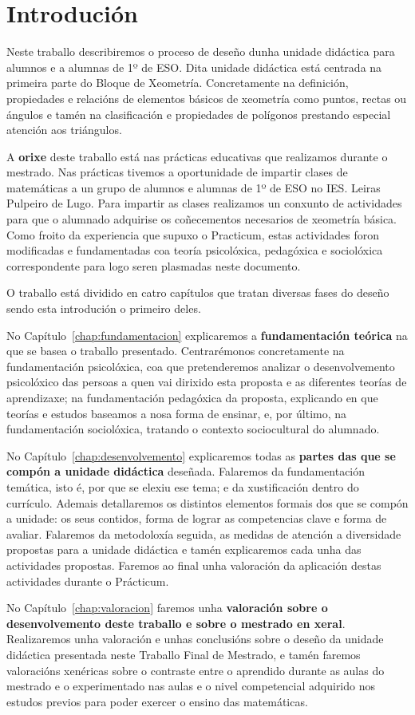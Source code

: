 %

\chapter[Introdución]{Introdución}
Neste traballo describiremos o proceso de deseño dunha unidade didáctica para alumnos e a alumnas de 1º de ESO. Dita unidade didáctica está centrada na primeira parte do Bloque de Xeometría. Concretamente na definición, propiedades e relacións de elementos básicos de xeometría como puntos, rectas ou ángulos e tamén na clasificación e propiedades de polígonos prestando especial atención aos triángulos.

A \textbf{orixe} deste traballo está nas prácticas educativas que realizamos durante o mestrado. Nas prácticas tivemos a oportunidade de impartir clases de matemáticas a un grupo de alumnos e alumnas de 1º de ESO no IES. Leiras Pulpeiro de Lugo. Para impartir as clases realizamos un conxunto de actividades para que o alumnado adquirise os coñecementos necesarios de xeometría básica. Como froito da experiencia que supuxo o Practicum, estas actividades foron modificadas e fundamentadas coa teoría psicolóxica, pedagóxica e sociolóxica correspondente para logo seren plasmadas neste documento.

O traballo está dividido en catro capítulos que tratan diversas fases do deseño sendo esta introdución o primeiro deles.

No Capítulo~\ref{chap:fundamentacion} explicaremos a \textbf{fundamentación teórica} na que se basea o traballo presentado. Centrarémonos concretamente na fundamentación psicolóxica, coa que pretenderemos analizar o desenvolvemento psicolóxico das persoas a quen vai dirixido esta proposta e as diferentes teorías de aprendizaxe; na fundamentación pedagóxica da proposta, explicando en que teorías e estudos baseamos a nosa forma de ensinar, e, por último, na fundamentación sociolóxica, tratando o contexto sociocultural do alumnado.

No Capítulo~\ref{chap:desenvolvemento} explicaremos todas as \textbf{partes das que se compón a unidade didáctica} deseñada. Falaremos da fundamentación temática, isto é, por que se elexiu ese tema; e da xustificación dentro do currículo. Ademais detallaremos os distintos elementos formais dos que se compón a unidade: os seus contidos, forma de lograr as competencias clave e forma de avaliar. Falaremos da metodoloxía seguida, as medidas de atención a diversidade propostas para a unidade didáctica e tamén explicaremos cada unha das actividades propostas. Faremos ao final unha valoración da aplicación destas actividades durante o Prácticum.

No Capítulo~\ref{chap:valoracion} faremos unha \textbf{valoración sobre o desenvolvemento deste traballo e sobre o mestrado en xeral}. Realizaremos unha valoración e unhas conclusións sobre o deseño da unidade didáctica presentada neste Traballo Final de Mestrado, e tamén faremos valoracións xenéricas sobre o contraste entre o aprendido durante as aulas do mestrado e o experimentado nas aulas e o nivel competencial adquirido nos estudos previos para poder exercer o ensino das matemáticas.
